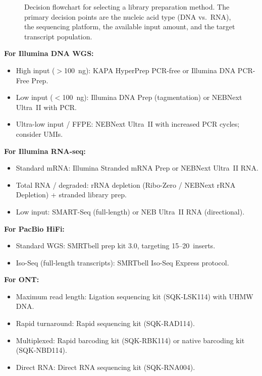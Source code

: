 \begin{figure}[htbp]
{%
}
\caption[Library preparation decision flowchart]{Decision flowchart for selecting a library preparation method. The primary decision points are the nucleic acid type (DNA vs.\ RNA), the sequencing platform, the available input amount, and the target transcript population.}
\label{fig:libprep_decision}
\end{figure}

\begin{protocolbox}[title={Library Prep Selection Summary}]
\textbf{For Illumina DNA WGS:}
\begin{itemize}[nosep]
  \item High input ($>$100~ng): KAPA HyperPrep PCR-free or Illumina DNA PCR-Free Prep.
  \item Low input ($<$100~ng): Illumina DNA Prep (tagmentation) or NEBNext Ultra~II with PCR.
  \item Ultra-low input / FFPE: NEBNext Ultra~II with increased PCR cycles; consider UMIs.
\end{itemize}

\textbf{For Illumina RNA-seq:}
\begin{itemize}[nosep]
  \item Standard mRNA: Illumina Stranded mRNA Prep or NEBNext Ultra~II RNA.
  \item Total RNA / degraded: rRNA depletion (Ribo-Zero / NEBNext rRNA Depletion) + stranded library prep.
  \item Low input: SMART-Seq (full-length) or NEB Ultra~II RNA (directional).
\end{itemize}

\textbf{For PacBio HiFi:}
\begin{itemize}[nosep]
  \item Standard WGS: SMRTbell prep kit 3.0, targeting 15--20\kilobase\ inserts.
  \item Iso-Seq (full-length transcripts): SMRTbell Iso-Seq Express protocol.
\end{itemize}

\textbf{For ONT:}
\begin{itemize}[nosep]
  \item Maximum read length: Ligation sequencing kit (SQK-LSK114) with UHMW DNA.
  \item Rapid turnaround: Rapid sequencing kit (SQK-RAD114).
  \item Multiplexed: Rapid barcoding kit (SQK-RBK114) or native barcoding kit (SQK-NBD114).
  \item Direct RNA: Direct RNA sequencing kit (SQK-RNA004).
\end{itemize}
\end{protocolbox}


